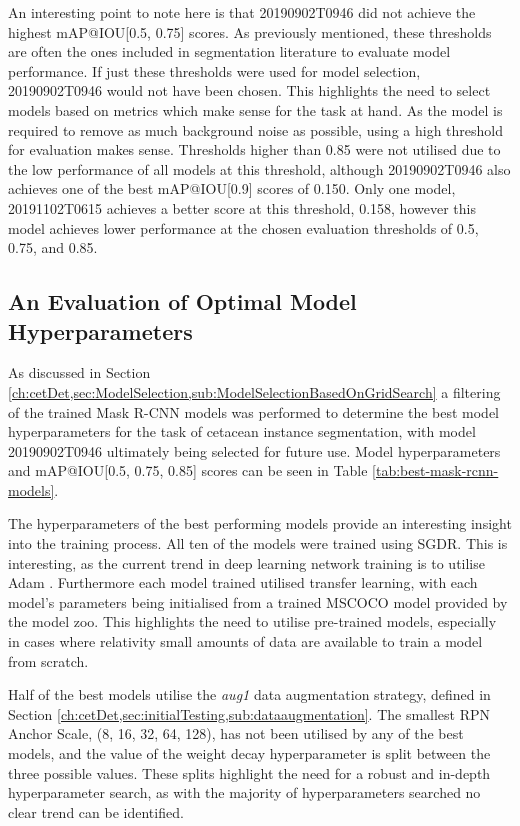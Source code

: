 An interesting point to note here is that 20190902T0946 did not achieve the highest mAP@IOU[0.5, 0.75] scores. As previously mentioned, these thresholds are often the ones included in segmentation literature to evaluate model performance. If just these thresholds were used for model selection, 20190902T0946 would not have been chosen. This highlights the need to select models based on metrics which make sense for the task at hand. As the model is required to remove as much background noise as possible, using a high threshold for evaluation makes sense. Thresholds higher than 0.85 were not utilised due to the low performance of all models at this threshold, although 20190902T0946 also achieves one of the best mAP@IOU[0.9] scores of 0.150. Only one model, 20191102T0615 achieves a better score at this threshold, 0.158, however this model achieves lower performance at the chosen evaluation thresholds of 0.5, 0.75, and 0.85.

\subsection{An Evaluation of Optimal Model Hyperparameters}\label{ch:cetDet,sec:ModelSelection,sub:OptimalHyperparameters}

As discussed in Section \ref{ch:cetDet,sec:ModelSelection,sub:ModelSelectionBasedOnGridSearch} a filtering of the trained Mask R-CNN models was performed to determine the best model hyperparameters for the task of cetacean instance segmentation, with model 20190902T0946 ultimately being selected for future use. Model hyperparameters and mAP@IOU[0.5, 0.75, 0.85] scores can be seen in Table \ref{tab:best-mask-rcnn-models}.

The hyperparameters of the best performing models provide an interesting insight into the training process. All ten of the models were trained using SGDR. This is interesting, as the current trend in deep learning network training is to utilise Adam \cite{karpathy_peek_2017}. Furthermore each model trained utilised transfer learning, with each model's parameters being initialised from a trained MSCOCO model provided by the model zoo. This highlights the need to utilise pre-trained models, especially in cases where relativity small amounts of data are available to train a model from scratch. 

Half of the best models utilise the \textit{aug1} data augmentation strategy, defined in Section \ref{ch:cetDet,sec:initialTesting,sub:dataaugmentation}. The smallest RPN Anchor Scale, (8, 16, 32, 64, 128), has not been utilised by any of the best models, and the value of the weight decay hyperparameter is split between the three possible values. These splits highlight the need for a robust and in-depth hyperparameter search, as with the majority of hyperparameters searched no clear trend can be identified.

